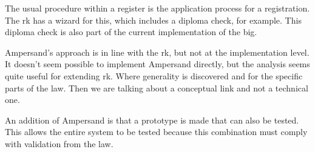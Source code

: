 The usual procedure within a register is the application process for a registration. 
The \acrlong{rk} has a wizard for this, which includes a diploma check, for example. 
This diploma check is also part of the current implementation of the \acrshort{big}.

Ampersand's approach is in line with the \acrlong{rk}, but not at the implementation level. 
It doesn't seem possible to implement Ampersand directly, but the analysis seems quite useful for extending \acrlong{rk}. 
Where generality is discovered and for the specific parts of the law. 
Then we are talking about a conceptual link and not a technical one.

An addition of Ampersand is that a prototype is made that can also be tested. 
This allows the entire system to be tested because this combination must comply with validation from the law.
